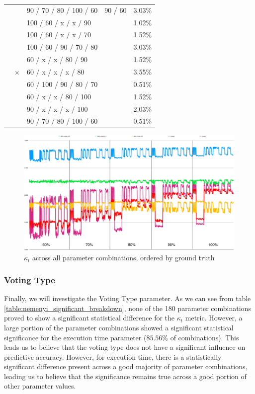 \begin{table}[]
\begin{tabular}{|l|c|l|c|c|}
 &  & 90 / 70 / 80 / 100 / 60 & 90 / 60 & 3.03\% \\ \cline{2-5} 
 & \multirow{9}{*}{$\times$} & 100 / 60 / x / x / 90 & \multirow{9}{*}{} & 1.02\% \\ \cline{3-3} \cline{5-5} 
 &  & 100 / 60 / x / x / 70 &  & 1.52\% \\ \cline{3-3} \cline{5-5} 
 &  & 100 / 60 / 90 / 70 / 80 &  & 3.03\% \\ \cline{3-3} \cline{5-5} 
 &  & 60 / x / x / 80 / 90 &  & 1.52\% \\ \cline{3-3} \cline{5-5} 
 &  & 60 / x / x / x / 80 &  & 3.55\% \\ \cline{3-3} \cline{5-5} 
 &  & 60 / 100 / 90 / 80 / 70 &  & 0.51\% \\ \cline{3-3} \cline{5-5} 
 &  & 60 / x / x / 80 / 100 &  & 1.52\% \\ \cline{3-3} \cline{5-5} 
 &  & 90 / x / x / x / 100 &  & 2.03\% \\ \cline{3-3} \cline{5-5} 
 &  & 90 / 70 / 80 / 100 / 60 &  & 0.51\% \\ \hline
\end{tabular}
\end{table}

\begin{figure}
  \includegraphics[width=\linewidth]{./images/chapter5/ground_truth}
\caption{\label{fig:order_by_ground_truth}$\kappa_t$ across all parameter combinations, ordered by ground truth}
\end{figure}

\subsubsection{Voting Type}

Finally, we will investigate the Voting Type parameter. As we can see from table \ref{table:nemenyi_significant_breakdown}, none of the 180 parameter combinations proved to show a significant statistical difference for the $\kappa_t$ metric. However, a large portion of the parameter combinations showed a significant statistical significance for the execution time parameter ($85.56\%$ of combinations). This leads us to believe that the voting type does not have a significant influence on predictive accuracy. However, for execution time, there is a statistically significant difference present across a good majority of parameter combinations, leading us to believe that the significance remains true across a good portion of other parameter values.

